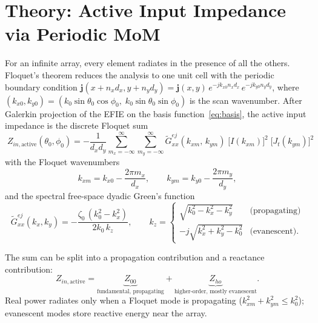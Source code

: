 \documentclass{article}
\begin{document}
\section{Theory: Active Input Impedance via Periodic MoM}

For an infinite array, every element radiates in the presence of all the others. Floquet's theorem reduces the analysis to one unit cell with the periodic boundary condition $\boldsymbol{j}(x+n_x d_x, y+n_y d_y) = \boldsymbol{j}(x,y)\,e^{-jk_{x0}n_x d_x}\,e^{-jk_{y0}n_y d_y}$, where $(k_{x0}, k_{y0}) = (k_0\sin\theta_0\cos\phi_0,\;k_0\sin\theta_0\sin\phi_0)$ is the scan wavenumber. After Galerkin projection of the EFIE on the basis function~\eqref{eq:basis}, the active input impedance is the discrete Floquet sum
\begin{equation}\label{eq:Zactive}
\boxed{\;
Z_{in,\text{active}}(\theta_0,\phi_0) = -\frac{1}{d_x d_y}\sum_{m_x=-\infty}^{\infty}\sum_{m_y=-\infty}^{\infty}
\widetilde{G}_{xx}^{ej}(k_{xm},\,k_{ym})\;\big[I(k_{xm})\big]^2\;\big[J_t(k_{ym})\big]^2\;
}
\end{equation}
with the Floquet wavenumbers
\begin{equation}\label{eq:floquet}
k_{xm} = k_{x0} - \frac{2\pi m_x}{d_x},\qquad
k_{ym} = k_{y0} - \frac{2\pi m_y}{d_y},
\end{equation}
and the spectral free-space dyadic Green's function
\begin{equation}\label{eq:Gxx}
\widetilde{G}_{xx}^{ej}(k_x,k_y) = -\frac{\zeta_0\,(k_0^2 - k_x^2)}{2k_0\,k_z},\qquad
k_z = \begin{cases}\sqrt{k_0^2 - k_x^2 - k_y^2} & \text{(propagating)} \\ -j\sqrt{k_x^2+k_y^2-k_0^2} & \text{(evanescent)}.\end{cases}
\end{equation}

The sum can be split into a propagation contribution and a reactance contribution:
\begin{equation}\label{eq:decomp}
Z_{in,\text{active}} = \underbrace{Z_{00}}_{\text{fundamental, propagating}} + \underbrace{Z_{ho}}_{\text{higher-order, mostly evanescent}}.
\end{equation}
Real power radiates only when a Floquet mode is propagating ($k_{xm}^2 + k_{ym}^2 \leq k_0^2$); evanescent modes store reactive energy near the array.
\end{document}
